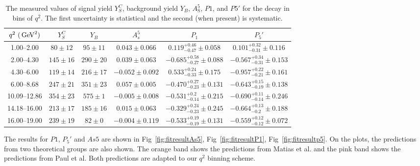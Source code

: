 \begin{table*}[!htb]
  \begin{center}
    \begin{footnotesize}
      \caption{The measured values of signal yield $Y^{C}_{S}$, background yield $Y_{B}$, $A^5_\mathrm{S}$, $P1$, and $P5'$ for the decay \BKpimm in bins of $q^2$.
        The first uncertainty is statistical and the second (when present) is systematic. 
        \label{tab:dataresult}}

      \begin{tabular}{c|ccc|cc}
        \hline
        $q^2~(\,\textrm{GeV}^2)$      & $Y^{C}_{S}$ & $Y_{B}$ & $A_s^5$ & $P_1$ & $P_5'$  \\
        \hline         
        1.00--2.00     & $80  \pm 12$ &    $95 \pm 11$    & $0.043 \pm 0.066$      & $0.119 ^{+ 0.46}_{- 0.47}\pm0.058$  & $0.101 ^{+ 0.32}_{- 0.31}\pm0.116$  \\
        2.00--4.30     & $145 \pm 16$ &    $290\pm 20$    & $0.039 \pm 0.063$      & $-0.685^{+ 0.58}_{- 0.27}\pm0.088$  & $-0.567^{+ 0.34}_{- 0.31}\pm0.153$  \\
        4.30--6.00     & $119 \pm 14$ &    $216\pm 17$    & $-0.052\pm 0.092$      & $0.533 ^{+ 0.24}_{- 0.33}\pm0.175$  & $-0.957^{+ 0.22}_{- 0.21}\pm0.161$  \\
        6.00--8.68     & $247 \pm 21$ &    $351\pm 23$    & $0.057 \pm 0.005$     & $-0.470^{+ 0.27}_{- 0.23}\pm0.131$  & $-0.643^{+ 0.15}_{- 0.19}\pm0.138$  \\
        10.09--12.86   & $354 \pm 23$ &    $575\pm  1$    & $-0.005\pm 0.008$    & $-0.531^{+ 0.2 }_{- 0.14}\pm0.215$  & $-0.690^{+ 0.11}_{- 0.14}\pm0.246$  \\
        14.18--16.00   & $213 \pm 17$ &    $185\pm 16$    & $0.015 \pm 0.063$     & $-0.329^{+ 0.24}_{- 0.23}\pm0.245$  & $-0.664^{+ 0.13}_{- 0.2 }\pm0.188$  \\
        16.00--19.00   & $239 \pm 19$ &    $ 82\pm 0 $    & $-0.004\pm 0.119$    & $-0.533^{+ 0.19}_{- 0.19}\pm0.131$  & $-0.559^{+ 0.12}_{- 0.12}\pm0.072$  \\

        \hline
      \end{tabular}
    \end{footnotesize}
  \end{center}
\end{table*}

The results for $P1$, $P_5'$ and $As5$ are shown in Fig~\ref{fig:fitresultAs5}, Fig~\ref{fig:fitresultP1}, Fig~\ref{fig:fitresultp5}.
On the plots, the predictions from two theoretical groups are also shown.
The orange band shows the predictions from Matias et al\cite{Genon:Swave}.
and the pink band shows the predictions from Paul et al\cite{Paul2015}.
Both predictions are adapted to our $q^2$ binning scheme.

